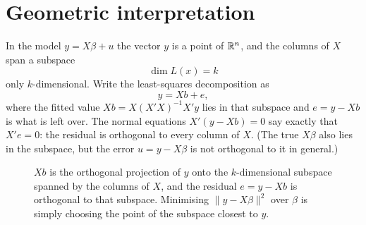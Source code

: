 \documentclass[11pt]{article}
\begin{document}
\section{Geometric interpretation}

In the model $y=X\beta+u$ the vector $y$ is a point of $\mathbb{R}^n$, and the columns of $X$ span a subspace
\[ \dim L(x)=k \]
only $k$-dimensional. Write the
least-squares decomposition as
\[ y=Xb+e, \]
where the fitted value $Xb=X(X'X)^{-1}X'y$ lies in that subspace and $e=y-Xb$ is
what is left over. The normal equations $X'(y-Xb)=0$ say exactly that $X'e=0$: the
residual is orthogonal to every column of $X$. (The true $X\beta$ also lies in the
subspace, but the error $u=y-X\beta$ is not orthogonal to it in general.)

\begin{figure}[ht]
\centering
{}
\caption{$Xb$ is the orthogonal projection of $y$ onto the $k$-dimensional
subspace spanned by the columns of $X$, and the residual $e=y-Xb$ is orthogonal
to that subspace. Minimising $\|y-X\beta\|^{2}$ over $\beta$ is simply choosing the
point of the subspace closest to $y$.}
\end{figure}
\end{document}
